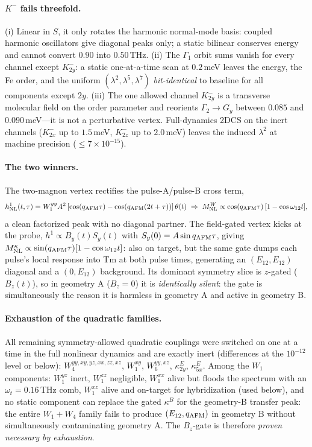\documentclass[11pt]{article}
\newcommand{\qafm}{q_{\rm AFM}}
\newcommand{\Mnl}{M_{\rm NL}}
\begin{document}
\paragraph{$K^-$ fails threefold.}
(i) Linear in $S$, it only rotates the harmonic normal-mode basis:
coupled harmonic oscillators give diagonal peaks only; a static bilinear
conserves energy and cannot convert $0.90$ into $0.50$\,THz.
(ii) The $\Gamma_1$ orbit sums vanish for every channel except
$K^-_{2y}$: a static one-at-a-time scan at $0.2$\,meV leaves the energy,
the Fe order, and the uniform $(\lambda^2,\lambda^5,\lambda^7)$
\emph{bit-identical} to baseline for all components except $2y$.
(iii) The one allowed channel $K^-_{2y}$ is a transverse molecular field
on the order parameter and reorients $\Gamma_2\to G_y$ between $0.085$
and $0.090$\,meV---it is not a perturbative vertex.  Full-dynamics 2DCS
on the inert channels ($K^-_{2x}$ up to $1.5$\,meV, $K^-_{2z}$ up to
$2.0$\,meV) leaves the induced $\lambda^2$ at machine precision
($\leq7\times10^{-15}$).

\paragraph{The two winners.}
The two-magnon vertex rectifies the pulse-A/pulse-B cross term,
\begin{equation}
  h^1_{\rm NL}(t,\tau)=W^{yy}_1A^2\left[\cos(\qafm\tau)
  -\cos(\qafm(2t+\tau))\right]\theta(t)
  \;\Rightarrow\;
  \Mnl^{W}\propto\cos(\qafm\tau)\,[1-\cos\omega_{12}t],
\end{equation}
a clean factorized peak with no diagonal partner.  The field-gated
vertex kicks at the probe, $h^1\propto B_y(t)S_y(t)$ with
$S_y(0)=A\sin\qafm\tau$, giving
$\Mnl^{\kappa}\propto\sin(\qafm\tau)[1-\cos\omega_{12}t]$: also on
target, but the same gate dumps each pulse's local response into Tm at
both pulse times, generating an $(E_{12},E_{12})$ diagonal and a
$(0,E_{12})$ background.  Its dominant symmetry slice is $z$-gated
($B_z(t)$), so in geometry A ($B_z=0$) it is \emph{identically silent}:
the gate is simultaneously the reason it is harmless in geometry A and
active in geometry B.

\paragraph{Exhaustion of the quadratic families.}
All remaining symmetry-allowed quadratic couplings were switched on one
at a time in the full nonlinear dynamics and are exactly inert
(differences at the $10^{-12}$ level or below): $W_4^{yy,xy,yz,xx,zz,xz}$,
$W_1^{xy}$, $W_6^{yy,xz}$, $\kappa^E_{2y}$, $\kappa^E_{5x}$.  Among the
$W_1$ components: $W_1^{yz}$ inert, $W_1^{zz}$ negligible, $W_1^{xx}$
alive but floods the spectrum with an $\omega_t=0.16$\,THz comb,
$W_1^{xz}$ alive and on-target for hybridization (used below), and no
static component can replace the gated $\kappa^B$ for the geometry-B
transfer peak: the entire $W_1{+}W_4$ family fails to produce
$(E_{12},\qafm)$ in geometry B without simultaneously contaminating
geometry A.  The $B_z$-gate is therefore \emph{proven necessary by
exhaustion}.
\end{document}
